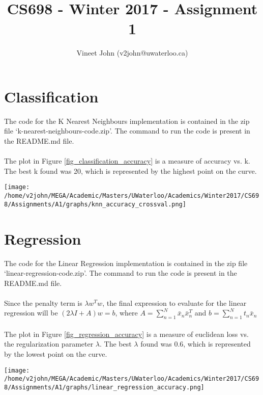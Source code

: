 \documentclass[a4paper]{article}
\title{CS698 - Winter 2017 - Assignment 1}
\author{Vineet John (v2john@uwaterloo.ca)}
\date{}
\begin{document}
\maketitle

\renewcommand\thesubsection{\alph{subsection}}

\section{Classification}

The code for the K Nearest Neighbours implementation is contained in the zip file `k-nearest-neighbours-code.zip'. The command to run the code is present in the README.md file.
\\\\
The plot in Figure \ref{fig_classification_accuracy} is a measure of accuracy vs. k. The best k found was 20, which is represented by the highest point on the curve.

\begin{figure*}[h]
    \centering
    \texttt{[image: /home/v2john/MEGA/Academic/Masters/UWaterloo/Academics/Winter2017/CS698/Assignments/A1/graphs/knn\_accuracy\_crossval.png]}
    \caption{Classification Accuracy}
    \label{fig_classification_accuracy}
\end{figure*}

\newpage

\section{Regression}

The code for the Linear Regression implementation is contained in the zip file `linear-regression-code.zip'. The command to run the code is present in the README.md file.
\\\\
Since the penalty term is $\lambda w^Tw$, the final expression to evaluate for the linear regression will be $(2\lambda I + A)w = b$, where $A = \sum_{n=1}^N \bar{x}_n \bar{x}_n^T$ and $b = \sum_{n=1}^N t_n \bar{x}_n$
\\\\
The plot in Figure \ref{fig_regression_accuracy} is a measure of euclidean loss vs. the regularization parameter $\lambda$. The best $\lambda$ found was 0.6, which is represented by the lowest point on the curve.


\begin{figure*}[h]
    \centering
    \texttt{[image: /home/v2john/MEGA/Academic/Masters/UWaterloo/Academics/Winter2017/CS698/Assignments/A1/graphs/linear\_regression\_accuracy.png]}
    \caption{Regression Accuracy}
    \label{fig_regression_accuracy}
\end{figure*}
\end{document}
